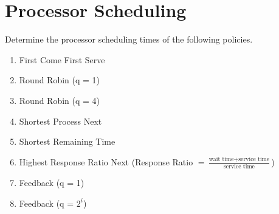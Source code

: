 \documentclass{article}
\begin{document}
\section{Processor Scheduling}
Determine the processor scheduling times of the following policies.
\begin{enumerate}
\item First Come First Serve
\item Round Robin (q = 1)
\item Round Robin (q = 4)
\item Shortest Process Next
\item Shortest Remaining Time
\item Highest Response Ratio Next (Response Ratio $= \frac{\text{wait time} + \text{service time}}{\text{service time}}$)
\item Feedback (q = 1)
\item Feedback (q = $2^{i}$)
\end{enumerate}
\end{document}
